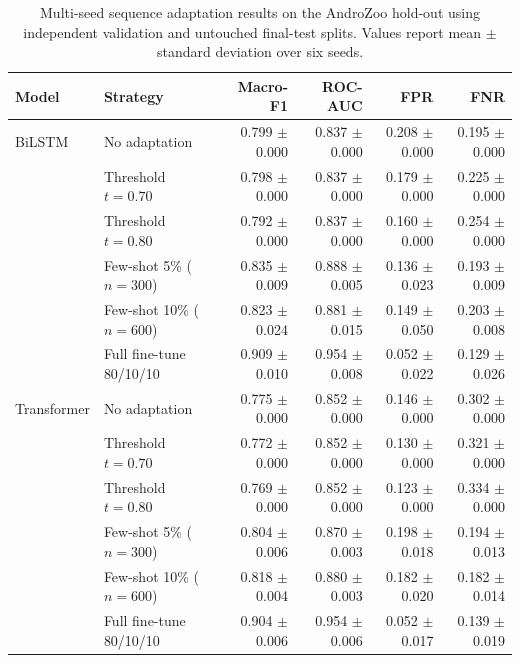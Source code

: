 \begin{table}[H]
\centering
\caption{Multi-seed sequence adaptation results on the AndroZoo hold-out using independent validation and untouched final-test splits. Values report mean $\pm$ standard deviation over six seeds.}
\label{tab:sequence_adaptation_multiseed}
\footnotesize
\setlength{\tabcolsep}{4pt}
\begin{tabular*}{\textwidth}{@{\extracolsep{\fill}}llrrrr@{}}
\toprule
\textbf{Model} & \textbf{Strategy} & \textbf{Macro-F1} & \textbf{ROC-AUC} & \textbf{FPR} & \textbf{FNR} \\
\midrule
BiLSTM & No adaptation & 0.799 $\pm$ 0.000 & 0.837 $\pm$ 0.000 & 0.208 $\pm$ 0.000 & 0.195 $\pm$ 0.000 \\
 & Threshold $t=0.70$ & 0.798 $\pm$ 0.000 & 0.837 $\pm$ 0.000 & 0.179 $\pm$ 0.000 & 0.225 $\pm$ 0.000 \\
 & Threshold $t=0.80$ & 0.792 $\pm$ 0.000 & 0.837 $\pm$ 0.000 & 0.160 $\pm$ 0.000 & 0.254 $\pm$ 0.000 \\
 & Few-shot 5\% ($n=300$) & 0.835 $\pm$ 0.009 & 0.888 $\pm$ 0.005 & 0.136 $\pm$ 0.023 & 0.193 $\pm$ 0.009 \\
 & Few-shot 10\% ($n=600$) & 0.823 $\pm$ 0.024 & 0.881 $\pm$ 0.015 & 0.149 $\pm$ 0.050 & 0.203 $\pm$ 0.008 \\
 & Full fine-tune 80/10/10 & 0.909 $\pm$ 0.010 & 0.954 $\pm$ 0.008 & 0.052 $\pm$ 0.022 & 0.129 $\pm$ 0.026 \\
\midrule
Transformer & No adaptation & 0.775 $\pm$ 0.000 & 0.852 $\pm$ 0.000 & 0.146 $\pm$ 0.000 & 0.302 $\pm$ 0.000 \\
 & Threshold $t=0.70$ & 0.772 $\pm$ 0.000 & 0.852 $\pm$ 0.000 & 0.130 $\pm$ 0.000 & 0.321 $\pm$ 0.000 \\
 & Threshold $t=0.80$ & 0.769 $\pm$ 0.000 & 0.852 $\pm$ 0.000 & 0.123 $\pm$ 0.000 & 0.334 $\pm$ 0.000 \\
 & Few-shot 5\% ($n=300$) & 0.804 $\pm$ 0.006 & 0.870 $\pm$ 0.003 & 0.198 $\pm$ 0.018 & 0.194 $\pm$ 0.013 \\
 & Few-shot 10\% ($n=600$) & 0.818 $\pm$ 0.004 & 0.880 $\pm$ 0.003 & 0.182 $\pm$ 0.020 & 0.182 $\pm$ 0.014 \\
 & Full fine-tune 80/10/10 & 0.904 $\pm$ 0.006 & 0.954 $\pm$ 0.006 & 0.052 $\pm$ 0.017 & 0.139 $\pm$ 0.019 \\
\bottomrule
\end{tabular*}
\end{table}
